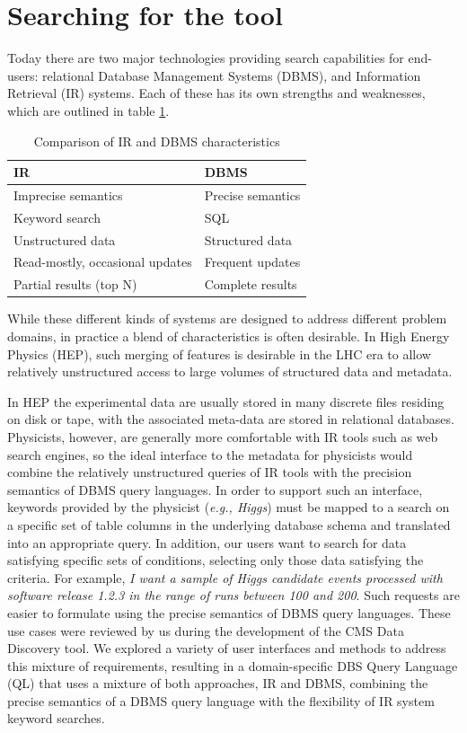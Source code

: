 \documentclass[a4paper]{jpconf}
\begin{document}
\section{Searching for the tool}

Today there are two major technologies providing search capabilities
for end-users: relational Database Management Systems (DBMS), and Information Retrieval (IR) systems.
Each of these has its own strengths and weaknesses, which
are outlined in table \ref{IR_DBMS}.

\begin{table}[hbt]
\centering
\begin{tabular}{ll}\hline
\hline

IR & DBMS \\
\hline
Imprecise semantics & Precise semantics \\
Keyword search & SQL \\
Unstructured data & Structured data \\
Read-mostly, occasional updates & Frequent updates \\
Partial results (top N) & Complete results \\
\hline
\hline
\end{tabular}
\caption{Comparison of IR and DBMS characteristics}
\label{IR_DBMS}
\end{table}

While these different kinds of systems are designed to address different problem domains,
in practice a blend of characteristics is often desirable. In High Energy Physics (HEP),
such merging of features is desirable in the LHC era to allow relatively unstructured
access to large volumes of structured data and metadata.

In HEP the experimental data are usually stored in many discrete files
residing on disk or tape, with the associated meta-data are stored in relational databases.
Physicists, however, are generally more comfortable with IR tools such as web search
engines, so the ideal interface to the metadata for physicists would combine the
relatively unstructured queries of IR tools with the precision semantics of DBMS query
languages.  In order to support such an interface, keywords provided by the physicist
({\it e.g., Higgs}) must be mapped to a search on a specific set of
table columns in the underlying database schema and translated into an appropriate query.
In addition, our users want
to search for data satisfying specific sets of conditions, selecting only those
data satisfying the criteria. For example, 
{\it I want a sample of Higgs candidate events processed with software release
1.2.3 in the range of runs between 100 and 200}.  Such requests are
easier to formulate using the precise semantics of DBMS query languages.
These use cases were reviewed by us\cite{DBS07}
during the development of the CMS Data Discovery tool. We explored
a variety of user interfaces and methods to address this mixture of requirements, resulting
in a domain-specific DBS Query Language (QL) that uses a mixture
of both approaches, IR and DBMS, combining the precise
semantics of a DBMS query language with the flexibility of
IR system keyword searches.
\end{document}
